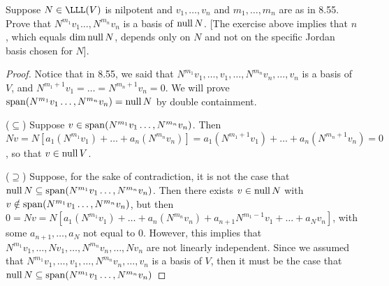 \begin{exercise}{6}
  Suppose $N\in\LLL(V)$ is nilpotent and $v_1,\dots,v_n$ and $m_1,\dots,m_n$ are as in 8.55. Prove that $N^{m_1}v_1\dots,N^{m_n}v_n$ is a basis of $\operatorname*{null} N$. [The exercise above implies that $n$, which equals $\dim\operatorname*{null} N$, depends only on $N$ and not on the specific Jordan basis chosen for $N$].
\end{exercise}
\begin{proof}
 Notice that in 8.55, we said that $N^{m_1}v_1,\dots,v_1,\dots,N^{m_n}v_n,\dots,v_n$ is a basis of $V$, and $N^{m_1+1}v_1=\dots=N^{m_n+1}v_n=0$. We will prove \\$\operatorname*{span}(N^{m_1}v_1\dots,N^{m_n}v_n) =\operatorname*{null} N$ by double containment.

 ($\subseteq$) Suppose $v\in\operatorname*{span}(N^{m_1}v_1\dots,N^{m_n}v_n)$. Then $Nv =N[a_1(N^{m_1}v_1)+\dots+a_n(N^{m_n}v_n)] =a_1(N^{m_1+1}v_1)+\dots+a_n(N^{m_n+1}v_n) =0$, so that $v\in\operatorname*{null} V$. 
 
 ($\supseteq$) Suppose, for the sake of contradiction, it is not the case that $\operatorname*{null} N\subseteq\operatorname*{span}(N^{m_1}v_1\dots,N^{m_n}v_n)$. Then there exists $v\in\operatorname*{null} N$ with\\ $v\notin\operatorname*{span}(N^{m_1}v_1\dots,N^{m_n}v_n)$, but then $0 =Nv = N[a_1(N^{m_1}v_1)+\dots+a_n(N^{m_n}v_n)+a_{n+1}N^{m_1-1}v_1+\dots+a_Nv_n]$, with some $a_{n+1},\dots,a_N$ not equal to 0. However, this implies that $N^{m_1}v_1,\dots,Nv_1,\dots,N^{m_n}v_n,\dots,Nv_n$ are not linearly independent. Since we assumed that $N^{m_1}v_1,\dots,v_1,\dots,N^{m_n}v_n,\dots,v_n$ is a basis of $V$, then it must be the case that $\operatorname*{null} N\subseteq\operatorname*{span}(N^{m_1}v_1\dots,N^{m_n}v_n)$
\end{proof}